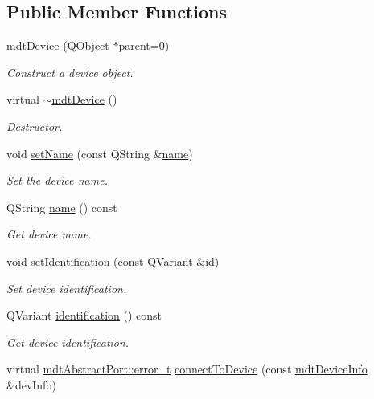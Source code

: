 \subsection*{Public Member Functions}
\begin{DoxyCompactItemize}
\item 
\hyperlink{classmdt_device_a6d501791e7243358cc61b144254b80db}{mdt\-Device} (\hyperlink{class_q_object}{Q\-Object} $\ast$parent=0)
\begin{DoxyCompactList}\small\item\em Construct a device object. \end{DoxyCompactList}\item 
virtual \hyperlink{classmdt_device_ac2a9cfd6042f3f9d8da4e84f044d3f4a}{$\sim$mdt\-Device} ()
\begin{DoxyCompactList}\small\item\em Destructor. \end{DoxyCompactList}\item 
void \hyperlink{classmdt_device_a80186f1aa6fbdc13f1652de978c35518}{set\-Name} (const Q\-String \&\hyperlink{classmdt_device_a7ad893c6885dbaef5a6cb980bfe627e0}{name})
\begin{DoxyCompactList}\small\item\em Set the device name. \end{DoxyCompactList}\item 
Q\-String \hyperlink{classmdt_device_a7ad893c6885dbaef5a6cb980bfe627e0}{name} () const 
\begin{DoxyCompactList}\small\item\em Get device name. \end{DoxyCompactList}\item 
void \hyperlink{classmdt_device_af6fddf7fba1f54e481a4f3445db64d98}{set\-Identification} (const Q\-Variant \&id)
\begin{DoxyCompactList}\small\item\em Set device identification. \end{DoxyCompactList}\item 
Q\-Variant \hyperlink{classmdt_device_a54845e1af6f6f98de7de79c3df9ac7b5}{identification} () const 
\begin{DoxyCompactList}\small\item\em Get device identification. \end{DoxyCompactList}\item 
virtual \hyperlink{classmdt_abstract_port_ad4121bb930c95887e77f8bafa065a85e}{mdt\-Abstract\-Port\-::error\-\_\-t} \hyperlink{classmdt_device_abab1b6e45af527880ce469ae318474c0}{connect\-To\-Device} (const \hyperlink{classmdt_device_info}{mdt\-Device\-Info} \&dev\-Info)

\end{DoxyCompactItemize}
